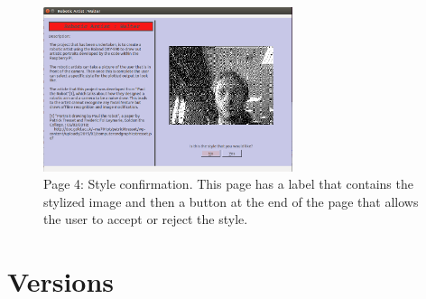 \documentclass{article}
\begin{document}
\begin{figure}[h]
    \centering
    \includegraphics[width=0.65\textwidth]{page4.png}
    \caption{Page 4: Style confirmation. This page has a label that contains the stylized image and then a button at the end of the page that allows the user to accept or reject the style.}
    \label{fig:page_4}
\end{figure}

\clearpage
    \section{Versions}
\end{document}
